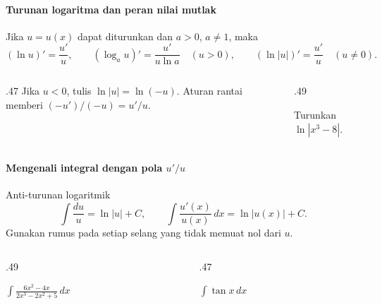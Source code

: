 \documentclass{../../kalkulus-ppt}
\begin{document}
\begin{frame}{\insertsection}
    \framesubtitle{Turunan logaritma dan peran nilai mutlak}
    \begin{teorema}
        Jika $u=u(x)$ dapat diturunkan dan $a>0$, $a\ne1$, maka
        \[
            (\ln u)'=\frac{u'}{u},\qquad
            (\log_a u)'=\frac{u'}{u\ln a}\quad(u>0),\qquad
            (\ln|u|)'=\frac{u'}{u}\quad(u\ne0).
        \]
    \end{teorema}
    \begin{columns}[t,onlytextwidth]
        \begin{column}{.47\textwidth}
            Jika $u<0$, tulis $\ln|u|=\ln(-u)$.
            Aturan rantai memberi $(-u')/(-u)=u'/u$.
        \end{column}
        \begin{column}{.49\textwidth}
            \begin{contoh}
                Turunkan $\ln|x^3-8|$.
            \end{contoh}
        \end{column}
    \end{columns}
\end{frame}

\begin{frame}{\insertsection}
    \framesubtitle{Mengenali integral dengan pola $u'/u$}
    \begin{block}{Anti-turunan logaritmik}
        \[
            \int\frac{du}{u}=\ln|u|+C,\qquad
            \int\frac{u'(x)}{u(x)}\,dx=\ln|u(x)|+C.
        \]
        Gunakan rumus pada setiap selang yang tidak memuat nol dari $u$.
    \end{block}
    \begin{columns}[t,onlytextwidth]
        \begin{column}{.49\textwidth}
            \begin{contoh}
                $\displaystyle\int\frac{6x^2-4x}{2x^3-2x^2+5}\,dx$
            \end{contoh}
        \end{column}
        \begin{column}{.47\textwidth}
            \begin{contoh}
                $\displaystyle\int \tan x\,dx$
            \end{contoh}
        \end{column}
    \end{columns}
\end{frame}
\end{document}
